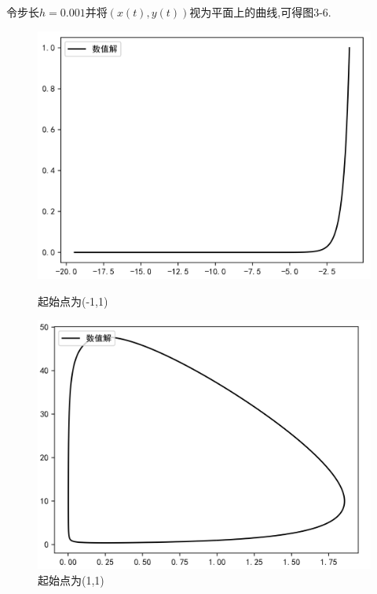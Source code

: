 \documentclass[a4paper]{article}%
\begin{document}
令步长$h=0.001$并将$(x(t),y(t))$视为平面上的曲线,可得图3-6.
\begin{figure}[H]
    \begin{minipage}{0.48\linewidth}
    \centering
    \includegraphics[scale=0.5]{起始点为(-1,1)}
    \caption{起始点为(-1,1)}
    \end{minipage}
    \begin{minipage}{0.48\linewidth}
    \centering
    \includegraphics[scale=0.5]{起始点为(1,1)}
    \caption{起始点为(1,1)}
    \end{minipage}
    \end{figure}
\end{document}
